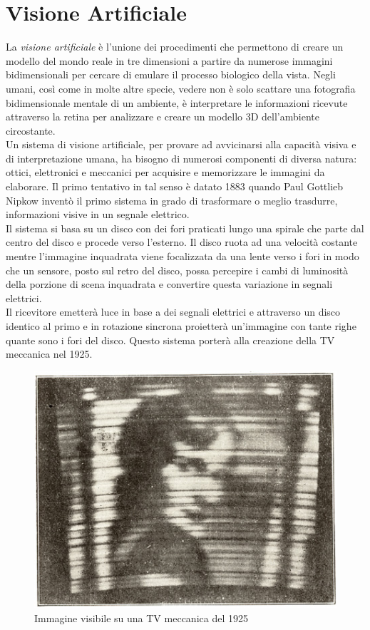 \chapter{Visione Artificiale}
\fancyfoot[C]{\thepage } 
La \textit{visione artificiale} è l'unione dei procedimenti che permettono di 
creare  un modello del mondo reale in tre dimensioni a partire da numerose 
immagini bidimensionali per cercare di emulare il processo biologico della vista.
Negli umani, così come in molte altre specie, vedere non è solo scattare una 
fotografia bidimensionale mentale di un ambiente, è interpretare le informazioni
ricevute attraverso la retina per analizzare e creare un modello 3D dell'ambiente
 circostante.\\	
Un sistema di visione artificiale, per provare ad avvicinarsi alla capacità visiva
e di interpretazione umana, ha bisogno di numerosi componenti di diversa natura: 
ottici, elettronici e meccanici per acquisire e memorizzare le immagini da elaborare.
Il primo tentativo in tal senso è datato 1883 quando  Paul Gottlieb Nipkow 
inventò il primo sistema 
in grado di trasformare o meglio trasdurre, informazioni visive in un segnale elettrico. 
\\Il sistema
 si basa su un disco con dei fori praticati lungo una spirale che parte dal centro del disco
 e procede verso l'esterno. Il disco ruota ad una velocità costante mentre l'immagine 
 inquadrata viene focalizzata da una lente verso i fori in modo che un sensore, 
 posto sul retro del disco, possa percepire i cambi di luminosità della porzione di scena
 inquadrata e convertire questa variazione in segnali elettrici. 
 \\Il ricevitore emetterà luce in base a dei 
 segnali elettrici e attraverso un disco identico al primo e in rotazione sincrona 
 proietterà un'immagine con tante righe quante sono i fori del disco.
 Questo sistema porterà alla creazione della TV meccanica nel 1925.
 \begin{figure}[!htb] \center
\includegraphics[width=\textwidth]{immagini/tv_meccanica.png}
\caption{Immagine visibile su una TV meccanica del 1925} 
\end{figure}
